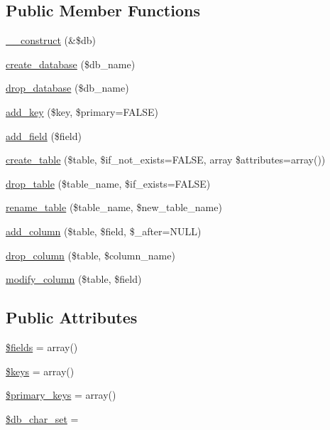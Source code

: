 \subsection*{Public Member Functions}
\begin{DoxyCompactItemize}
\item 
\mbox{\hyperlink{class_c_i___d_b__forge_aaf2ef772755ec6f361d44e16cc9ffd69}{\+\_\+\+\_\+construct}} (\&\$db)
\item 
\mbox{\hyperlink{class_c_i___d_b__forge_a902a7267babceb2ce595706f217e00ad}{create\+\_\+database}} (\$db\+\_\+name)
\item 
\mbox{\hyperlink{class_c_i___d_b__forge_a9612987b2d4230de2638d15857e92e67}{drop\+\_\+database}} (\$db\+\_\+name)
\item 
\mbox{\hyperlink{class_c_i___d_b__forge_a70e5c5fca213d8ad84cc71ba1698c3dd}{add\+\_\+key}} (\$key, \$primary=F\+A\+L\+SE)
\item 
\mbox{\hyperlink{class_c_i___d_b__forge_acdaeff5aae80d6128c7ed9817ee82f1c}{add\+\_\+field}} (\$field)
\item 
\mbox{\hyperlink{class_c_i___d_b__forge_a0904375ba759fbe7961b424a46c0adae}{create\+\_\+table}} (\$table, \$if\+\_\+not\+\_\+exists=F\+A\+L\+SE, array \$attributes=array())
\item 
\mbox{\hyperlink{class_c_i___d_b__forge_ac46bdab43413dcc115d1be4a05dbcd0f}{drop\+\_\+table}} (\$table\+\_\+name, \$if\+\_\+exists=F\+A\+L\+SE)
\item 
\mbox{\hyperlink{class_c_i___d_b__forge_a0fb4802acad335ebdecd921d59de9a51}{rename\+\_\+table}} (\$table\+\_\+name, \$new\+\_\+table\+\_\+name)
\item 
\mbox{\hyperlink{class_c_i___d_b__forge_a855261dcf98c0cf401aa469994919c51}{add\+\_\+column}} (\$table, \$field, \$\+\_\+after=N\+U\+LL)
\item 
\mbox{\hyperlink{class_c_i___d_b__forge_aed0d6a0b12511dbdf19bb68fed7fd467}{drop\+\_\+column}} (\$table, \$column\+\_\+name)
\item 
\mbox{\hyperlink{class_c_i___d_b__forge_aa03cc8de0ac9ce03016bd2b50ddeff87}{modify\+\_\+column}} (\$table, \$field)
\end{DoxyCompactItemize}
\subsection*{Public Attributes}
\begin{DoxyCompactItemize}
\item 
\mbox{\hyperlink{class_c_i___d_b__forge_ab2303c817e3b402b77b7f99627b9c319}{\$fields}} = array()
\item 
\mbox{\hyperlink{class_c_i___d_b__forge_af20635b6c08e03bfee9e3fc036fa80f3}{\$keys}} = array()
\item 
\mbox{\hyperlink{class_c_i___d_b__forge_a09349689030ba7198a094abf357c78bc}{\$primary\+\_\+keys}} = array()
\item 
\mbox{\hyperlink{class_c_i___d_b__forge_a6e90c3633cd0984a7e8de501f7771c53}{\$db\+\_\+char\+\_\+set}} = \textquotesingle{}\textquotesingle{}
\end{DoxyCompactItemize}
